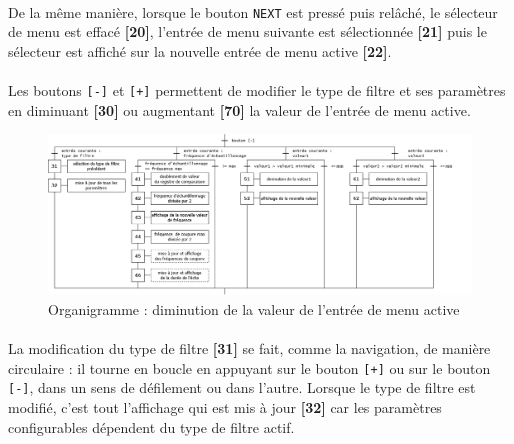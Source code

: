 \documentclass{article}
\begin{document}
    \paragraph{}
    De la même manière, lorsque le bouton \texttt{NEXT} est pressé puis relâché, le sélecteur de menu est effacé \textbf{[20]}, l'entrée de menu suivante est sélectionnée \textbf{[21]} puis le sélecteur est affiché sur la nouvelle entrée de menu active \textbf{[22]}.

    \paragraph{}
    Les boutons \texttt{[-]} et \texttt{[+]} permettent de modifier le type de filtre et ses paramètres en diminuant \textbf{[30]} ou augmentant \textbf{[70]} la valeur de l'entrée de menu active.

    \begin{figure}[H]
        \centering
        \includegraphics[width=\textwidth]{./images/orga_decrease.png}
        \caption{Organigramme : diminution de la valeur de l'entrée de menu active}
    \end{figure}

    \paragraph{}
    La modification du type de filtre \textbf{[31]} se fait, comme la navigation, de manière circulaire : il tourne en boucle en appuyant sur le bouton \texttt{[+]} ou sur le bouton \texttt{[-]}, dans un sens de défilement ou dans l'autre. Lorsque le type de filtre est modifié, c'est tout l'affichage qui est mis à jour \textbf{[32]} car les paramètres configurables dépendent du type de filtre actif.
\end{document}
